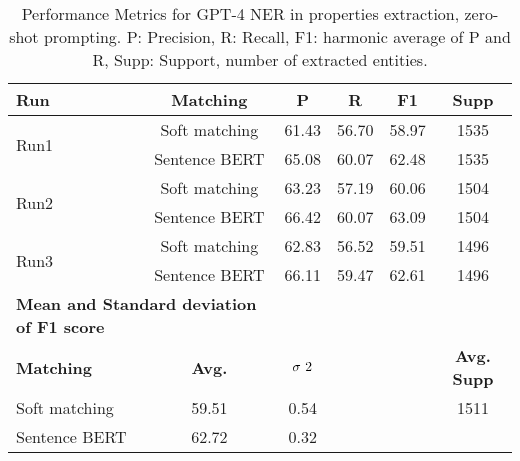 \begin{table}[htbp]
\small
  \centering
  \caption{Performance Metrics for GPT-4 NER in properties extraction, zero-shot prompting. P: Precision, R: Recall, F1: harmonic average of P and R, Supp: Support, number of extracted entities.}
  \begin{tabular}{lccccc}
    \toprule
    \textbf{Run} & \textbf{Matching} & \textbf{P} & \textbf{R} & \textbf{F1} & \textbf{Supp} \\
    \midrule
    \multirow{2}{*}{Run1} & Soft matching & 61.43 & 56.70 & 58.97 & 1535 \\
    & Sentence BERT & 65.08 & 60.07 & 62.48 & 1535 \\
    \midrule
    \multirow{2}{*}{Run2} & Soft matching & 63.23 & 57.19 & 60.06 & 1504 \\
    & Sentence BERT & 66.42 & 60.07 & 63.09 & 1504 \\
    \midrule
    \multirow{2}{*}{Run3} & Soft matching & 62.83 & 56.52 & 59.51 & 1496 \\
    & Sentence BERT & 66.11 & 59.47 & 62.61 & 1496 \\
    \midrule
    \multicolumn{2}{l}{\textbf{Mean and Standard deviation of F1 score}} & & & & \\
    \midrule
    \textbf{Matching} & \textbf{Avg.} & $\sigma\textsuperscript{2}$ & & & \textbf{Avg. Supp}\\
    Soft matching & 59.51 & 0.54 & & & 1511 \\
    Sentence BERT & 62.72 & 0.32 & & & \\
    \bottomrule
  \end{tabular}
\end{table}


